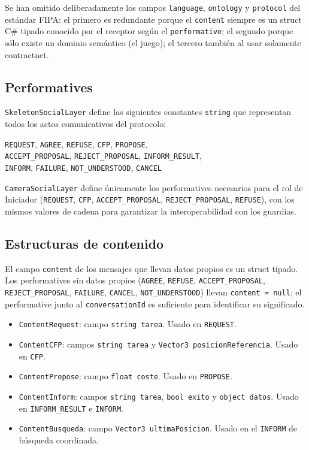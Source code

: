 \documentclass[a4paper,12pt]{article}
\begin{document}
Se han omitido deliberadamente los campos \texttt{language}, \texttt{ontology} y \texttt{protocol} del estándar FIPA: el primero es redundante porque el \texttt{content} siempre es un struct C\# tipado conocido por el receptor según el \texttt{performative}; el segundo porque sólo existe un dominio semántico (el juego); el tercero también al usar solamente contractnet.

\subsection*{Performatives}

\texttt{SkeletonSocialLayer} define las siguientes constantes \texttt{string} que representan todos los actos comunicativos del protocolo:

\begin{center}
\texttt{REQUEST}, \texttt{AGREE}, \texttt{REFUSE}, \texttt{CFP}, \texttt{PROPOSE},\\
\texttt{ACCEPT\_PROPOSAL}, \texttt{REJECT\_PROPOSAL}, \texttt{INFORM\_RESULT},\\
\texttt{INFORM}, \texttt{FAILURE}, \texttt{NOT\_UNDERSTOOD}, \texttt{CANCEL}
\end{center}

\texttt{CameraSocialLayer} define únicamente los performatives necesarios para el rol de Iniciador (\texttt{REQUEST}, \texttt{CFP}, \texttt{ACCEPT\_PROPOSAL}, \texttt{REJECT\_PROPOSAL}, \texttt{REFUSE}), con los mismos valores de cadena para garantizar la interoperabilidad con los guardias.

\subsection*{Estructuras de contenido}

El campo \texttt{content} de los mensajes que llevan datos propios es un struct tipado. Los performatives sin datos propios (\texttt{AGREE}, \texttt{REFUSE}, \texttt{ACCEPT\_PROPOSAL}, \texttt{REJECT\_PROPOSAL}, \texttt{FAILURE}, \texttt{CANCEL}, \texttt{NOT\_UNDERSTOOD}) llevan \texttt{content = null}; el performative junto al \texttt{conversationId} es suficiente para identificar su significado.

\begin{itemize}
    \item \texttt{ContentRequest}: campo \texttt{string tarea}. Usado en \texttt{REQUEST}.
    \item \texttt{ContentCFP}: campos \texttt{string tarea} y \texttt{Vector3 posicionReferencia}. Usado en \texttt{CFP}.
    \item \texttt{ContentPropose}: campo \texttt{float coste}. Usado en \texttt{PROPOSE}.
    \item \texttt{ContentInform}: campos \texttt{string tarea}, \texttt{bool exito} y \texttt{object datos}. Usado en \texttt{INFORM\_RESULT} e \texttt{INFORM}.
    \item \texttt{ContentBusqueda}: campo \texttt{Vector3 ultimaPosicion}. Usado en el \texttt{INFORM} de búsqueda coordinada.
\end{itemize}
\end{document}
